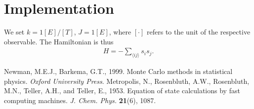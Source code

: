 \documentclass[fleqn]{scrartcl}
\begin{document}
\section{Implementation}

We set $k = 1 [E]/[T]$, $J = 1 [E]$, where $[\cdot]$ refers to the unit of the respective observable.
The Hamiltonian is thus
%
\begin{align*}
  H = -\sum_{\langle i j \rangle} s_i s_j.
\end{align*}



\begin{thebibliography}{xx}
   Newman, M.E.J., Barkema, G.T., 1999. Monte Carlo methods in statistical physics. \emph{Oxford University Press}.
   Metropolis, N., Rosenbluth, A.W., Rosenbluth, M.N., Teller, A.H., and Teller, E., 1953. Equation of state calculations by fast computing machines. \emph{J. Chem. Phys.} \textbf{21}(6), 1087.
\end{thebibliography}
\end{document}

